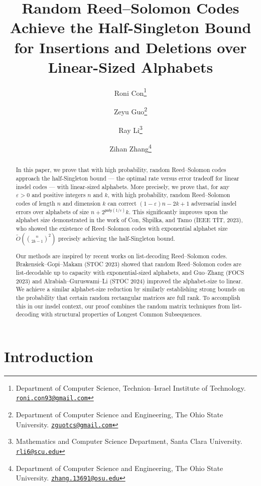 \documentclass[11pt]{article}
\theoremstyle{plain}
\theoremstyle{definition}
\theoremstyle{remark}
\newcommand{\poly}{\mathsf{poly}}
\renewcommand{\epsilon}{\varepsilon}
\begin{document}
\date{}
 \title{Random Reed--Solomon Codes Achieve the Half-Singleton Bound
 for Insertions and Deletions over Linear-Sized Alphabets}
\author{
Roni Con\thanks{Department of Computer Science, Technion--Israel Institute of Technology. \href{mailto:roni.con93@gmail.com}{\texttt{roni.con93@gmail.com}}  }
\and
Zeyu Guo\thanks{Department of Computer Science and Engineering, The Ohio State University. \href{mailto:zguotcs@gmail.com}{\texttt{zguotcs@gmail.com}}}  
\and
Ray Li\thanks{Mathematics and Computer Science Department, Santa Clara University. \href{mailto:rli6@scu.edu}{\texttt{rli6@scu.edu}}}  
\and
Zihan Zhang\thanks{Department of Computer Science and Engineering, The Ohio State University. \href{mailto:zhang.13691@buckeyemail.osu.edu}{\texttt{zhang.13691@osu.edu}} 
}}
\maketitle
\begin{abstract}
In this paper, we prove that with high probability, random Reed--Solomon codes approach the half-Singleton bound --- the optimal rate versus error tradeoff for linear insdel codes ---  with linear-sized alphabets.
More precisely, we prove that, for any $\epsilon>0$ and positive integers $n$ and $k$, with high probability, random Reed--Solomon codes of length $n$ and dimension $k$ can correct $(1-\varepsilon)n-2k+1$ adversarial insdel errors over alphabets of size $n+2^{\poly(1/\varepsilon)}k$.
This significantly improves upon the alphabet size demonstrated in the work of Con, Shpilka, and Tamo (IEEE TIT, 2023), who showed the existence of Reed--Solomon codes with exponential alphabet size $\widetilde O\left(\binom{n}{2k-1}^2\right)$ precisely achieving the half-Singleton bound.

Our methods are inspired by recent works on list-decoding Reed--Solomon codes. Brakensiek--Gopi--Makam (STOC 2023) showed that random Reed--Solomon codes are list-decodable up to capacity with exponential-sized alphabets, and Guo--Zhang (FOCS 2023) and Alrabiah--Guruswami--Li (STOC 2024) improved the alphabet-size to linear. We achieve a similar alphabet-size reduction by similarly establishing strong bounds on the probability that certain random rectangular matrices are full rank.
To accomplish this in our insdel context, our proof combines the random matrix techniques from list-decoding with structural properties of Longest Common Subsequences.
\end{abstract}
\newpage
\section{Introduction}
\end{document}
